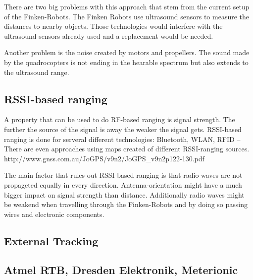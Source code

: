 

There are two big problems with this approach that stem from the current setup of the Finken-Robots.
The Finken Robots use ultrasound sensors to measure the distances to nearby objects.
Those technologies would interfere with the ultrasound sensors already used and a replacement would be needed.

Another problem is the noise created by motors and propellers.
The sound made by the quadrocopters is not ending in the hearable spectrum but also extends to the ultrasound range.

\subsection{RSSI-based ranging}

A property that can be used to do RF-based ranging is signal strength.
The further the source of the signal is away the weaker the signal gets.
RSSI-based ranging is done for serveral different technologies: Bluetooth, WLAN, RFID –
There are even approaches using maps created of different RSSI-ranging sources. http://www.gnss.com.au/JoGPS/v9n2/JoGPS\_v9n2p122-130.pdf 

The main factor that rules out RSSI-based ranging is that radio-waves are not propageted equally in every direction. 
Antenna-orientation might have a much bigger impact on signal strength than distance.
Additionally radio waves might be weakend when travelling through the Finken-Robots and by doing so passing wires and electronic components.

\subsection{External Tracking}




\subsection{Atmel RTB, Dresden Elektronik, Meterionic}

